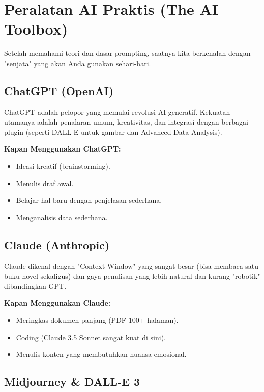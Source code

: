 \chapter{Peralatan AI Praktis (The AI Toolbox)}
\label{chap:tools}

Setelah memahami teori dan dasar prompting, saatnya kita berkenalan dengan "senjata" yang akan Anda gunakan sehari-hari.

\section{ChatGPT (OpenAI)}

ChatGPT adalah pelopor yang memulai revolusi AI generatif. Kekuatan utamanya adalah penalaran umum, kreativitas, dan integrasi dengan berbagai plugin (seperti DALL-E untuk gambar dan Advanced Data Analysis).

\begin{tipbox}
\textbf{Kapan Menggunakan ChatGPT:}
\begin{itemize}
    \item Ideasi kreatif (brainstorming).
    \item Menulis draf awal.
    \item Belajar hal baru dengan penjelasan sederhana.
    \item Menganalisis data sederhana.
\end{itemize}
\end{tipbox}

\section{Claude (Anthropic)}

Claude dikenal dengan "Context Window" yang sangat besar (bisa membaca satu buku novel sekaligus) dan gaya penulisan yang lebih natural dan kurang "robotik" dibandingkan GPT.

\begin{tipbox}
\textbf{Kapan Menggunakan Claude:}
\begin{itemize}
    \item Meringkas dokumen panjang (PDF 100+ halaman).
    \item Coding (Claude 3.5 Sonnet sangat kuat di sini).
    \item Menulis konten yang membutuhkan nuansa emosional.
\end{itemize}
\end{tipbox}

\section{Midjourney \& DALL-E 3}

